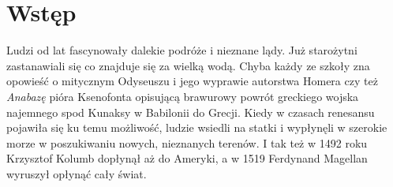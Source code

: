 \documentclass[a4paper]{book}
\begin{document}
	

\kslistofremarks

\cleardoublepage

	
\mainmatter %
	
	\chapter{Wstęp}
	\label{id:cha:wstep}
		 
			Ludzi od lat fascynowały dalekie podróże i nieznane lądy. Już starożytni zastanawiali się co znajduje się za wielką wodą. Chyba każdy ze szkoły zna opowieść o mitycznym Odyseuszu i jego wyprawie autorstwa Homera czy też \textit{Anabazę} pióra Ksenofonta opisującą brawurowy powrót greckiego wojska najemnego spod Kunaksy w Babilonii do Grecji. Kiedy w czasach renesansu pojawiła się ku temu możliwość, ludzie wsiedli na statki i wypłynęli w szerokie morze w poszukiwaniu nowych, nieznanych terenów. I tak też w 1492 roku Krzysztof Kolumb dopłynął aż do Ameryki, a w 1519 Ferdynand Magellan wyruszył opłynąć cały świat. 
			
\end{document}
